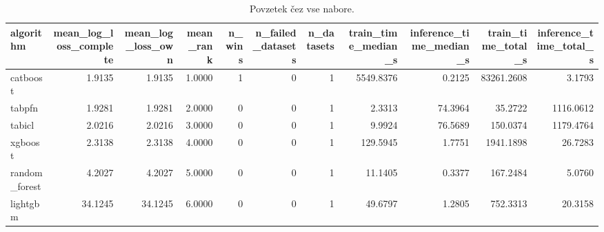 \begin{table}[htbp]
\centering
\caption{Povzetek čez vse nabore.}
\label{tab:overall}
\begin{tabular}{lrrrrrrrrrr}
\hline
algorithm & mean\_log\_loss\_complete & mean\_log\_loss\_own & mean\_rank & n\_wins & n\_failed\_datasets & n\_datasets & train\_time\_median\_s & inference\_time\_median\_s & train\_time\_total\_s & inference\_time\_total\_s \\
\hline
catboost & 1.9135 & 1.9135 & 1.0000 & 1 & 0 & 1 & 5549.8376 & 0.2125 & 83261.2608 & 3.1793 \\
tabpfn & 1.9281 & 1.9281 & 2.0000 & 0 & 0 & 1 & 2.3313 & 74.3964 & 35.2722 & 1116.0612 \\
tabicl & 2.0216 & 2.0216 & 3.0000 & 0 & 0 & 1 & 9.9924 & 76.5689 & 150.0374 & 1179.4764 \\
xgboost & 2.3138 & 2.3138 & 4.0000 & 0 & 0 & 1 & 129.5945 & 1.7751 & 1941.1898 & 26.7283 \\
random\_forest & 4.2027 & 4.2027 & 5.0000 & 0 & 0 & 1 & 11.1405 & 0.3377 & 167.2484 & 5.0760 \\
lightgbm & 34.1245 & 34.1245 & 6.0000 & 0 & 0 & 1 & 49.6797 & 1.2805 & 752.3313 & 20.3158 \\
\hline
\end{tabular}
\end{table}
